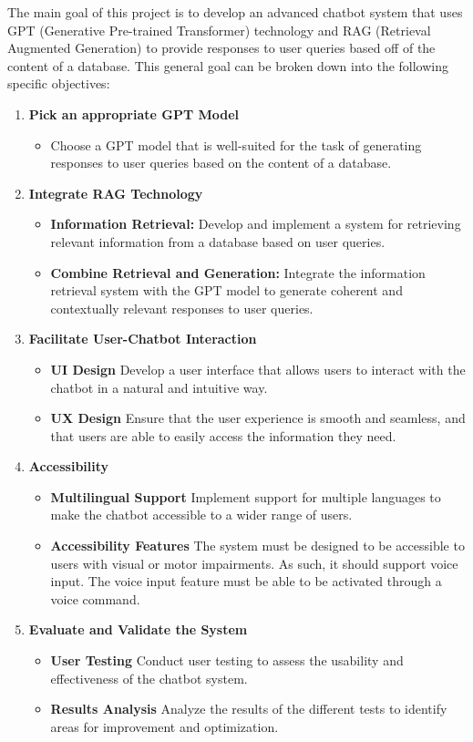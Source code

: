\documentclass[a4paper,12pt,twoside]{ThesisStyle}
\begin{document}
The main goal of this project is to develop an advanced chatbot system that uses GPT (Generative Pre-trained Transformer) technology and RAG (Retrieval Augmented Generation) to provide responses to user queries based off of the content of a database. This general goal can be broken down into the following specific objectives:

\begin{enumerate}
  \item \textbf{Pick an appropriate GPT Model}
        \begin{itemize}
          \item Choose a GPT model that is well-suited for the task of generating responses to user queries based on the content of a database.
        \end{itemize}
  \item \textbf{Integrate RAG Technology}
        \begin{itemize}
          \item \textbf{Information Retrieval:} Develop and implement a system for retrieving relevant information from a database based on user queries.
          \item \textbf{Combine Retrieval and Generation:} Integrate the information retrieval system with the GPT model to generate coherent and contextually relevant responses to user queries.
        \end{itemize}
  \item \textbf{Facilitate User-Chatbot Interaction}
        \begin{itemize}
          \item \textbf{UI Design} Develop a user interface that allows users to interact with the chatbot in a natural and intuitive way.
          \item \textbf{UX Design} Ensure that the user experience is smooth and seamless, and that users are able to easily access the information they need.
        \end{itemize}
  \item \textbf{Accessibility}
        \begin{itemize}
          \item \textbf{Multilingual Support} Implement support for multiple languages to make the chatbot accessible to a wider range of users.
          \item \textbf{Accessibility Features} The system must be designed to be accessible to users with visual or motor impairments. As such, it should support voice input. The voice input feature must be able to be activated through a voice command.
        \end{itemize}
  \item \textbf{Evaluate and Validate the System}
        \begin{itemize}
          \item \textbf{User Testing} Conduct user testing to assess the usability and effectiveness of the chatbot system.
          \item \textbf{Results Analysis} Analyze the results of the different tests to identify areas for improvement and optimization.
        \end{itemize}
\end{enumerate}
\end{document}
